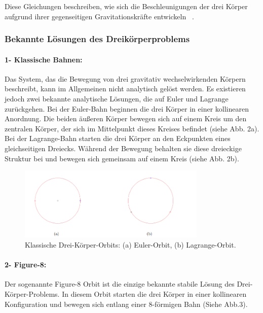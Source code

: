 \documentclass[a4paper,12pt,twoside]{article}
\begin{document}
Diese Gleichungen beschreiben, wie sich die Beschleunigungen der drei Körper aufgrund ihrer gegenseitigen Gravitationskräfte entwickeln ~\cite{threebodylibretexts}.

\subsubsection{Bekannte Lösungen des Dreikörperproblems}
\paragraph{1- Klassische Bahnen: }
Das System, das die Bewegung von drei gravitativ wechselwirkenden Körpern beschreibt, kann im Allgemeinen nicht analytisch gelöst werden. Es existieren jedoch zwei bekannte analytische Lösungen, die auf Euler und Lagrange zurückgehen.
Bei der Euler-Bahn beginnen die drei Körper in einer kollinearen Anordnung. Die beiden äußeren Körper bewegen sich auf einem Kreis um den zentralen Körper, der sich im Mittelpunkt dieses Kreises befindet (siehe Abb. 2a).
Bei der Lagrange-Bahn starten die drei Körper an den Eckpunkten eines gleichseitigen Dreiecks. Während der Bewegung behalten sie diese dreieckige Struktur bei und bewegen sich gemeinsam auf einem Kreis (siehe Abb. 2b).

\begin{figure}[H]
	\centering
	\includegraphics[width=0.8\textwidth]{EulerUndLagrange.png}
	\caption[Eintrag in Abbildungsverzeichnis von Grumpy Cat]{Klassische Drei-Körper-Orbits: (a) Euler-Orbit, (b) Lagrange-Orbit.}
	\label{EulerUndLagrange .}
\end{figure}

\paragraph{2- Figure-8: }
Der sogenannte Figure-8 Orbit ist die einzige bekannte stabile Lösung des Drei-Körper-Problems. In diesem Orbit starten die drei Körper in einer kollinearen Konfiguration und bewegen sich entlang einer 8-förmigen Bahn (Siehe Abb.3).
\end{document}
